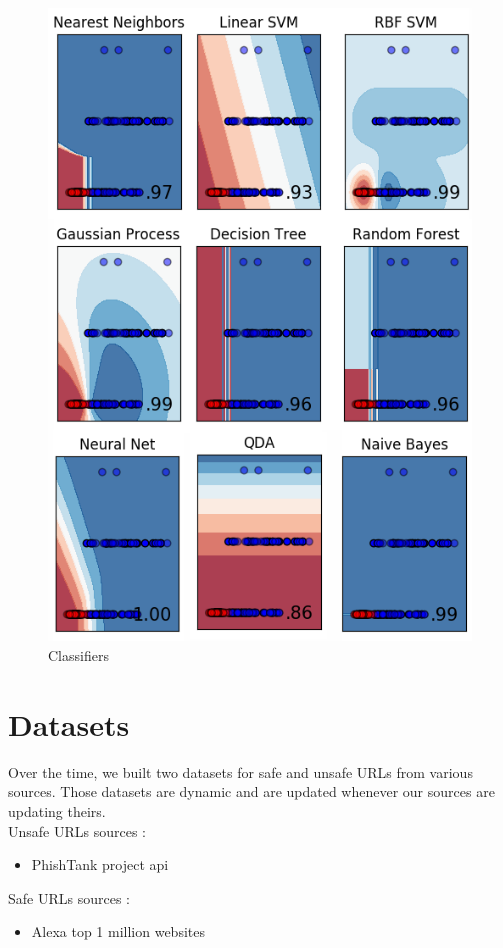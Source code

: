 \documentclass[conference,11pt]{IEEEtran}
\begin{document}
\begin{figure}[!t]
  \centering
  \includegraphics[width=\linewidth]{classifiers-list}
  \caption{Classifiers}
  \label{classifiers-list}
\end{figure}

\section{Datasets}
Over the time, we built two datasets for safe and unsafe URLs from various
sources. Those datasets are dynamic and are updated whenever our sources are
updating theirs. \\
Unsafe URLs sources :
\begin{itemize}
  \item PhishTank project api
\end{itemize}
Safe URLs sources :
\begin{itemize}
  \item Alexa top 1 million websites
\end{itemize}
\end{document}
